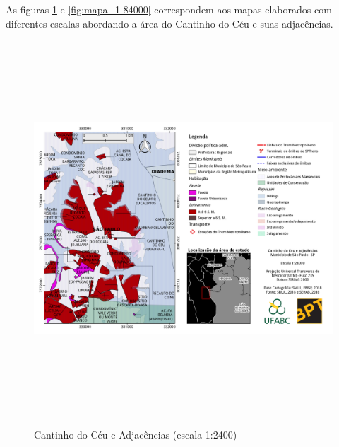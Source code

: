 	As figuras \ref*{fig:mapa_1-24000} e \ref*{fig:mapa_1-84000} correspondem aos mapas elaborados com diferentes escalas abordando a área do Cantinho do Céu e suas adjacências.

	\begin{landscape}
		\begin{figure}
			\centering
			\caption{Cantinho do Céu e Adjacências (escala 1:2400)}
			\includegraphics[height=14cm,keepaspectratio]{img/mapa_1-24000}
			\label{fig:mapa_1-24000}
		\end{figure}
	\end{landscape}
	
